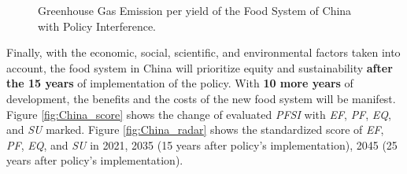 \documentclass[12pt]{article}
\begin{document}
\begin{figure}[H]
\begin{minipage}[t]{0.48\textwidth}
        \caption{Greenhouse Gas Emission per yield of the Food System of China with Policy Interference.\label{fig:China_GHG}}
    \end{minipage}
\end{figure}

Finally, with the economic, social, scientific, and environmental factors taken into account, the food system in China will prioritize equity and sustainability \textbf{after the 15 years} of implementation of the policy. With \textbf{10 more years} of development, the benefits and the costs of the new food system will be manifest. Figure \ref{fig:China_score} shows the change of evaluated \textit{PFSI} with \textit{EF}, \textit{PF}, \textit{EQ}, and \textit{SU} marked. Figure \ref{fig:China_radar} shows the standardized score of \textit{EF}, \textit{PF}, \textit{EQ}, and \textit{SU} in 2021, 2035 (15 years after policy's implementation), 2045 (25 years after policy's implementation).
\end{document}
